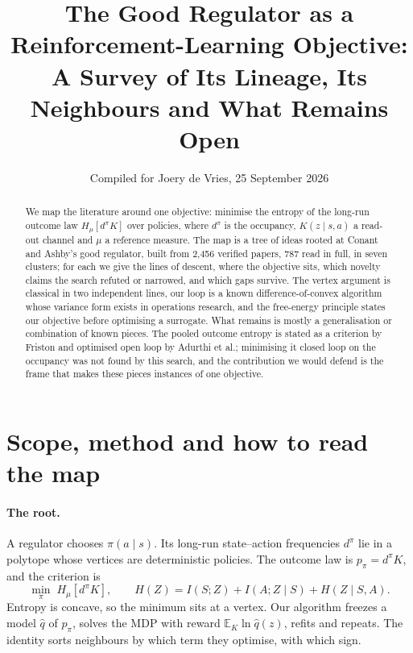 \documentclass[10pt]{article}
\title{The Good Regulator as a Reinforcement-Learning Objective:\\ A Survey of Its Lineage, Its Neighbours and What Remains Open}
\author{Compiled for Joery de Vries, 25 September 2026}
\date{}
\newcommand{\Hmu}{H_\mu}
\newcommand{\dpi}{d^\pi}
\begin{document}
\maketitle
\thispagestyle{fancy}

\begin{abstract}
\noindent
We map the literature around one objective: minimise the entropy of the long-run outcome law $\Hmu[\dpi K]$ over policies, where $\dpi$ is the occupancy, $K(z\mid s,a)$ a read-out channel and $\mu$ a reference measure.
The map is a tree of ideas rooted at Conant and Ashby's good regulator, built from 2{,}456 verified papers, 787 read in full, in seven clusters; for each we give the lines of descent, where the objective sits, which novelty claims the search refuted or narrowed, and which gaps survive.
The vertex argument is classical in two independent lines, our loop is a known difference-of-convex algorithm whose variance form exists in operations research, and the free-energy principle states our objective before optimising a surrogate.
What remains is mostly a generalisation or combination of known pieces. The pooled outcome entropy is stated as a criterion by Friston and optimised open loop by Adurthi et al.; minimising it closed loop on the occupancy was not found by this search, and the contribution we would defend is the frame that makes these pieces instances of one objective.
\end{abstract}

\section{Scope, method and how to read the map}

\paragraph{The root.}
A regulator chooses $\pi(a\mid s)$. Its long-run state--action frequencies $\dpi$ lie in a polytope whose vertices are deterministic policies. The outcome law is $p_\pi = \dpi K$, and the criterion is
\begin{equation}\label{eq:root}
\min_\pi \; \Hmu[\dpi K], \qquad H(Z) = I(S;Z) + I(A;Z\mid S) + H(Z\mid S,A).
\end{equation}
Entropy is concave, so the minimum sits at a vertex. Our algorithm freezes a model $\hat q$ of $p_\pi$, solves the MDP with reward $\mathbb{E}_K \ln \hat q(z)$, refits and repeats. The identity sorts neighbours by which term they optimise, with which sign.
\end{document}
